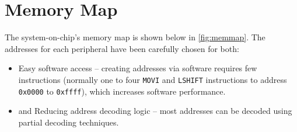 \newpage
\section{Memory Map}
The system-on-chip's memory map is shown below in \cref{fig:memmap}. The addresses for each peripheral have been carefully chosen for both:
\begin{itemize}
\item Easy software access -- creating addresses via software requires few instructions (normally one to four \verb|MOVI| and \verb|LSHIFT| instructions to address \verb|0x0000| to  \verb|0xffff|), which increases software performance.
\item and Reducing address decoding logic -- most addresses can be decoded using partial decoding techniques.
\end{itemize}

